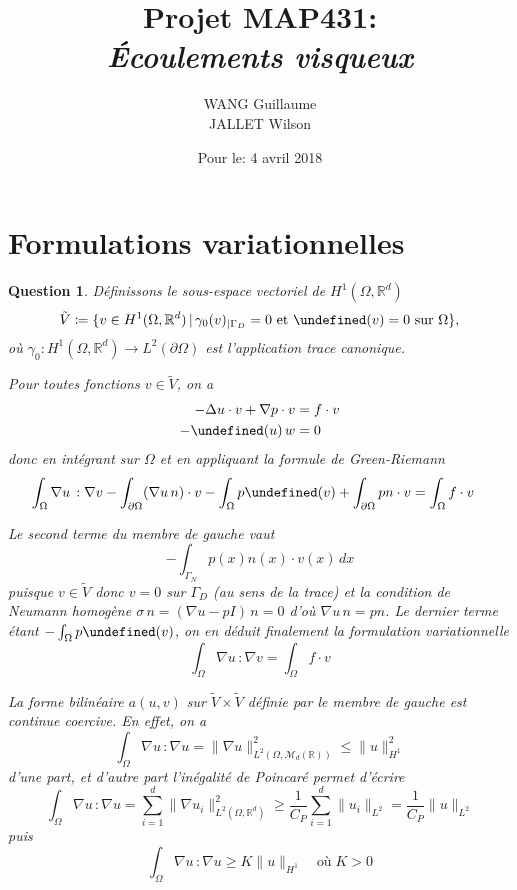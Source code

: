 \documentclass{article}
\title{\textbf{Projet MAP431:}\\
\textit{Écoulements visqueux}}
\author{
    WANG Guillaume\\
    JALLET Wilson
}
\date{Pour le: 4 avril 2018}
\newcommand{\RR}{\mathbb R}
\theoremstyle{plain}
\newtheorem{ques}{Question}
\let\div\undefined
\DeclareMathOperator{\div}{div}
\begin{document}
\maketitle

\section{Formulations variationnelles}

\begin{ques}
Définissons le sous-espace vectoriel de $H^1(\Omega,\RR^d)$
\[
    \tilde V \coloneqq \{v\in H^1(\Omega,\RR^d)\,|\, \gamma_0(v)_{|\Gamma_D} = 0 \text{ et } \div(v) = 0 \text{ sur } \Omega\},
\]
où $\gamma_0:H^1(\Omega,\RR^d)\longrightarrow L^2(\partial\Omega)$ est l'application trace canonique. 


Pour toutes fonctions $v \in \tilde{V}$, on a 
\begin{align*}
    -\Delta u\cdot v + \nabla p\cdot v &= f\cdot v \\
    -\div(u)\,w &= 0
\end{align*}
donc en intégrant sur $\Omega$ et en appliquant la formule de Green-Riemann
\begin{align*}
    \int_\Omega \nabla u\,:\nabla v - \int_{\partial\Omega}(\nabla u\, n)\cdot v - \int_\Omega p\div(v) + \int_{\partial\Omega}pn\cdot v
    &= \int_\Omega f\cdot v
\end{align*}

Le second terme du membre de gauche vaut
\[
    -\int_{\Gamma_N} p(x) n(x)\cdot v(x)\,dx
\]
puisque $v\in \tilde{V}$ donc $v = 0$ sur $\Gamma_D$ (au sens de la trace) et la condition de Neumann homogène $\sigma\,n = (\nabla u - pI)\,n = 0$ d'où $\nabla u\, n = pn$. Le dernier terme étant $-\int_\Omega p\div(v)$, on en déduit finalement la formulation variationnelle
\begin{equation}\label{formVar0}
    \int_\Omega \nabla u\,:\nabla v = \int_\Omega f\cdot v \tag{FV}
\end{equation}

La forme bilinéaire $a(u,v)$ sur $\tilde{V}\times \tilde{V}$ définie par le membre de gauche est continue coercive. En effet, on a
\[
    \int_\Omega \nabla u\,:\nabla u = \|\nabla u\|_{L^2(\Omega,\mathcal M_d(\RR))}^2 \leq \|u\|_{H^1}^2
\]
d'une part, et d'autre part l'inégalité de Poincaré permet d'écrire
\[
    \int_\Omega \nabla u\,:\nabla u 
    = \sum_{i=1}^d \|\nabla u_i\|_{L^2(\Omega,\RR^d)}^2
    \geq \frac{1}{C_P}\sum_{i=1}^d \|u_i\|_{L^2} = \frac 1{C_P}\|u\|_{L^2}
\]
puis
\[
    \int_\Omega \nabla u\,:\nabla u \geq K \|u \|_{H^1} \quad\text{où} \; K > 0
    \]


\end{ques}
\end{document}
